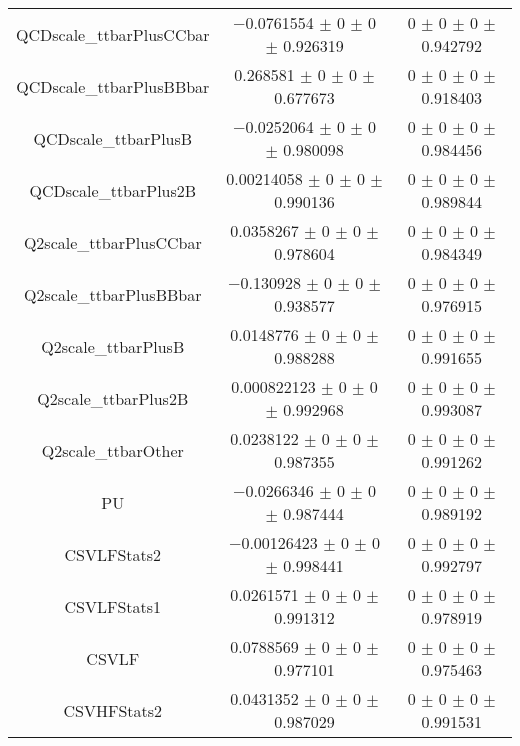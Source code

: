 \begin{table}
\begin{tabular}{ccc}
QCDscale\_ttbarPlusCCbar 	& \num{-0.0761554} $\pm$ \num{0} $\pm$ \num{0} $\pm$ \num{0.926319} 	& \num{0} $\pm$ \num{0} $\pm$ \num{0} $\pm$ \num{0.942792}\\
QCDscale\_ttbarPlusBBbar 	& \num{0.268581} $\pm$ \num{0} $\pm$ \num{0} $\pm$ \num{0.677673} 	& \num{0} $\pm$ \num{0} $\pm$ \num{0} $\pm$ \num{0.918403}\\
QCDscale\_ttbarPlusB 	& \num{-0.0252064} $\pm$ \num{0} $\pm$ \num{0} $\pm$ \num{0.980098} 	& \num{0} $\pm$ \num{0} $\pm$ \num{0} $\pm$ \num{0.984456}\\
QCDscale\_ttbarPlus2B 	& \num{0.00214058} $\pm$ \num{0} $\pm$ \num{0} $\pm$ \num{0.990136} 	& \num{0} $\pm$ \num{0} $\pm$ \num{0} $\pm$ \num{0.989844}\\
Q2scale\_ttbarPlusCCbar 	& \num{0.0358267} $\pm$ \num{0} $\pm$ \num{0} $\pm$ \num{0.978604} 	& \num{0} $\pm$ \num{0} $\pm$ \num{0} $\pm$ \num{0.984349}\\
Q2scale\_ttbarPlusBBbar 	& \num{-0.130928} $\pm$ \num{0} $\pm$ \num{0} $\pm$ \num{0.938577} 	& \num{0} $\pm$ \num{0} $\pm$ \num{0} $\pm$ \num{0.976915}\\
Q2scale\_ttbarPlusB 	& \num{0.0148776} $\pm$ \num{0} $\pm$ \num{0} $\pm$ \num{0.988288} 	& \num{0} $\pm$ \num{0} $\pm$ \num{0} $\pm$ \num{0.991655}\\
Q2scale\_ttbarPlus2B 	& \num{0.000822123} $\pm$ \num{0} $\pm$ \num{0} $\pm$ \num{0.992968} 	& \num{0} $\pm$ \num{0} $\pm$ \num{0} $\pm$ \num{0.993087}\\
Q2scale\_ttbarOther 	& \num{0.0238122} $\pm$ \num{0} $\pm$ \num{0} $\pm$ \num{0.987355} 	& \num{0} $\pm$ \num{0} $\pm$ \num{0} $\pm$ \num{0.991262}\\
PU 	& \num{-0.0266346} $\pm$ \num{0} $\pm$ \num{0} $\pm$ \num{0.987444} 	& \num{0} $\pm$ \num{0} $\pm$ \num{0} $\pm$ \num{0.989192}\\
CSVLFStats2 	& \num{-0.00126423} $\pm$ \num{0} $\pm$ \num{0} $\pm$ \num{0.998441} 	& \num{0} $\pm$ \num{0} $\pm$ \num{0} $\pm$ \num{0.992797}\\
CSVLFStats1 	& \num{0.0261571} $\pm$ \num{0} $\pm$ \num{0} $\pm$ \num{0.991312} 	& \num{0} $\pm$ \num{0} $\pm$ \num{0} $\pm$ \num{0.978919}\\
CSVLF 	& \num{0.0788569} $\pm$ \num{0} $\pm$ \num{0} $\pm$ \num{0.977101} 	& \num{0} $\pm$ \num{0} $\pm$ \num{0} $\pm$ \num{0.975463}\\
CSVHFStats2 	& \num{0.0431352} $\pm$ \num{0} $\pm$ \num{0} $\pm$ \num{0.987029} 	& \num{0} $\pm$ \num{0} $\pm$ \num{0} $\pm$ \num{0.991531}\\

\end{tabular}
\end{table}
